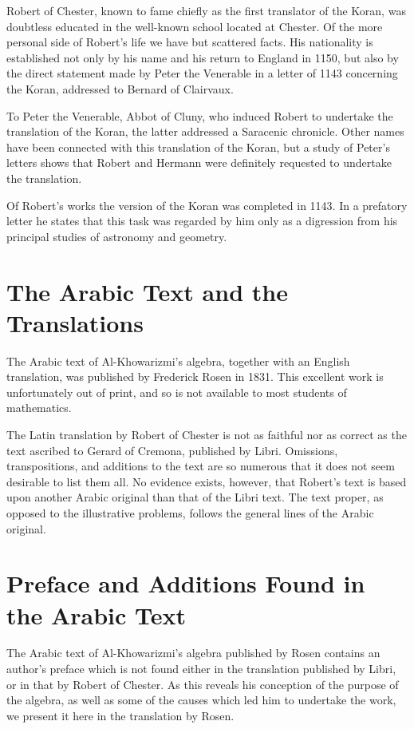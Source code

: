 \documentclass[11pt,a4paper]{book}
\begin{document}
Robert of Chester, known to fame chiefly as the first translator of the Koran, was doubtless educated in the well-known school located at Chester. Of the more personal side of Robert's life we have but scattered facts. His nationality is established not only by his name and his return to England in 1150, but also by the direct statement made by Peter the Venerable in a letter of 1143 concerning the Koran, addressed to Bernard of Clairvaux.

To Peter the Venerable, Abbot of Cluny, who induced Robert to undertake the translation of the Koran, the latter addressed a Saracenic chronicle. Other names have been connected with this translation of the Koran, but a study of Peter's letters shows that Robert and Hermann were definitely requested to undertake the translation.

Of Robert's works the version of the Koran was completed in 1143. In a prefatory letter he states that this task was regarded by him only as a digression from his principal studies of astronomy and geometry.

\chapter{The Arabic Text and the Translations}

The Arabic text of Al-Khowarizmi's algebra, together with an English translation, was published by Frederick Rosen in 1831. This excellent work is unfortunately out of print, and so is not available to most students of mathematics.

The Latin translation by Robert of Chester is not as faithful nor as correct as the text ascribed to Gerard of Cremona, published by Libri. Omissions, transpositions, and additions to the text are so numerous that it does not seem desirable to list them all. No evidence exists, however, that Robert's text is based upon another Arabic original than that of the Libri text. The text proper, as opposed to the illustrative problems, follows the general lines of the Arabic original.

\chapter{Preface and Additions Found in the Arabic Text}

The Arabic text of Al-Khowarizmi's algebra published by Rosen contains an author's preface which is not found either in the translation published by Libri, or in that by Robert of Chester. As this reveals his conception of the purpose of the algebra, as well as some of the causes which led him to undertake the work, we present it here in the translation by Rosen.
\end{document}
